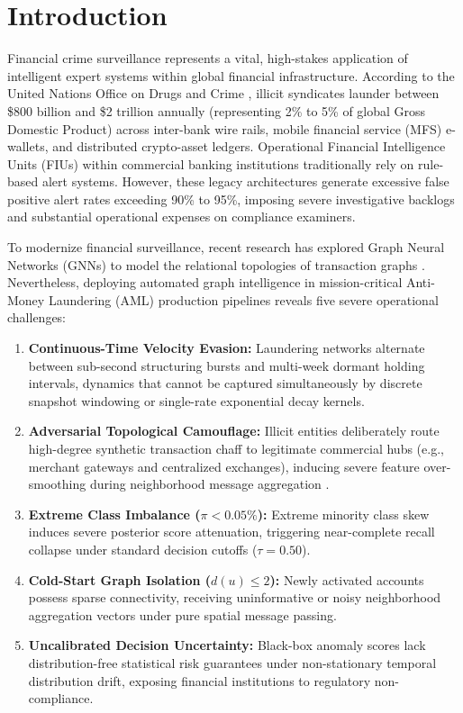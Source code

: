 \section{Introduction}
\label{sec:introduction}
Financial crime surveillance represents a vital, high-stakes application of intelligent expert systems within global financial infrastructure. According to the United Nations Office on Drugs and Crime \citep{unodc2011illicit}, illicit syndicates launder between \$800 billion and \$2 trillion annually (representing 2\% to 5\% of global Gross Domestic Product) across inter-bank wire rails, mobile financial service (MFS) e-wallets, and distributed crypto-asset ledgers. Operational Financial Intelligence Units (FIUs) within commercial banking institutions traditionally rely on rule-based alert systems. However, these legacy architectures generate excessive false positive alert rates exceeding 90\% to 95\%, imposing severe investigative backlogs and substantial operational expenses on compliance examiners.

To modernize financial surveillance, recent research has explored Graph Neural Networks (GNNs) to model the relational topologies of transaction graphs \citep{kipf2017semi, hamilton2017inductive, weber2019anti, hu2020heterogeneous}. Nevertheless, deploying automated graph intelligence in mission-critical Anti-Money Laundering (AML) production pipelines reveals five severe operational challenges:
\begin{enumerate}
    \item \textbf{Continuous-Time Velocity Evasion:} Laundering networks alternate between sub-second structuring bursts and multi-week dormant holding intervals, dynamics that cannot be captured simultaneously by discrete snapshot windowing \citep{pareja2020evolvegcn} or single-rate exponential decay kernels.
    \item \textbf{Adversarial Topological Camouflage:} Illicit entities deliberately route high-degree synthetic transaction chaff to legitimate commercial hubs (e.g., merchant gateways and centralized exchanges), inducing severe feature over-smoothing during neighborhood message aggregation \citep{dou2020enhancing}.
    \item \textbf{Extreme Class Imbalance ($\pi < 0.05\%$):} Extreme minority class skew induces severe posterior score attenuation, triggering near-complete recall collapse under standard decision cutoffs ($\tau = 0.50$).
    \item \textbf{Cold-Start Graph Isolation ($d(u) \le 2$):} Newly activated accounts possess sparse connectivity, receiving uninformative or noisy neighborhood aggregation vectors under pure spatial message passing.
    \item \textbf{Uncalibrated Decision Uncertainty:} Black-box anomaly scores lack distribution-free statistical risk guarantees under non-stationary temporal distribution drift, exposing financial institutions to regulatory non-compliance.
\end{enumerate}

